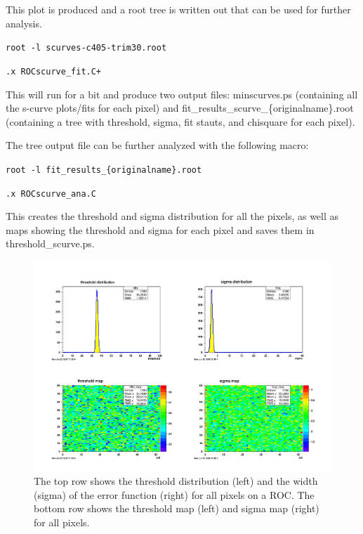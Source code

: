 \documentclass[english]{article}
\begin{document}
This plot is produced and a root tree is written out that can be used
for further analysis.

\texttt{root -l scurves-c405-trim30.root}

\texttt{.x ROCscurve\_fit.C+}

This will run for a bit and produce two output files: minscurves.ps
(containing all the s-curve plots/fits for each pixel) and fit\_results\_scurve\_\{originalname\}.root
(containing a tree with threshold, sigma, fit stauts, and chisquare
for each pixel).

The tree output file can be further analyzed with the following macro:

\texttt{root -l fit\_results\_\{originalname\}.root}

\texttt{.x ROCscurve\_ana.C}

This creates the threshold and sigma distribution for all the pixels,
as well as maps showing the threshold and sigma for each pixel and
saves them in threshold\_scurve.ps.

%
\begin{figure}
\noindent \begin{centering}
\includegraphics[scale=0.6]{c405-thrsigma-trim36} 
\par\end{centering}

\protect\caption{The top row shows the threshold distribution (left) and the width
(sigma) of the error function (right) for all pixels on a ROC. The
bottom row shows the threshold map (left) and sigma map (right) for
all pixels.}
%
\end{figure}
\end{document}
